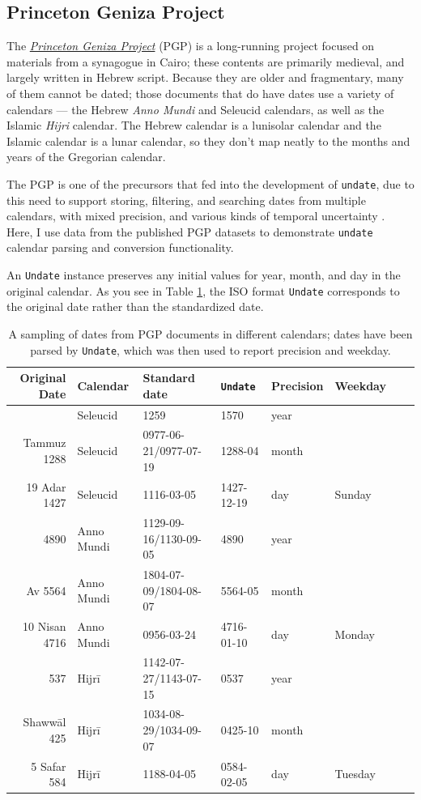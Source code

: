 \documentclass[final]{anthology-ch} %
\begin{document}
\subsection{Princeton Geniza Project}\label{princeton-geniza-project}

The \href{https://geniza.princeton.edu/}{\textit{Princeton Geniza Project}} (PGP) is a long-running project focused on materials from a synagogue in Cairo; these contents are primarily medieval, and largely written in Hebrew script. Because they are older and fragmentary, many of them cannot be dated;  those documents that do have dates use a variety of calendars — the Hebrew \textit{Anno Mundi} and Seleucid calendars, as well as the Islamic \textit{Hijri} calendar. The Hebrew calendar is a lunisolar calendar and the Islamic calendar is a lunar calendar, so they don't map neatly to the months and years of the Gregorian calendar.

The PGP is one of the precursors that fed into the development of \texttt{undate}, due to this need to support storing, filtering, and searching dates from multiple calendars, with mixed precision, and various kinds of temporal uncertainty \cite{rustow_dating_2020}. Here, I use data from the published PGP datasets \cite{rustow_princeton_2025} to demonstrate \texttt{undate} calendar parsing and conversion functionality. 

An \texttt{Undate} instance preserves any initial values for year, month, and day in the original calendar. As you see in Table \ref{tab:pgp-parsed-dates}, the ISO format \texttt{Undate} corresponds to the original date rather than the standardized date.

\begin{table}[h]
  \centering 
  \begin{tabular}{rlllllll}
    \toprule
Original Date & Calendar & Standard date & \texttt{Undate} & Precision & Weekday \\ 
\midrule\addlinespace[2.5pt]
1570 & Seleucid & 1259 & 1570 & year &  \\
Tammuz 1288 & Seleucid & 0977-06-21/0977-07-19 & 1288-04 & month &  \\
19 Adar 1427 & Seleucid & 1116-03-05 & 1427-12-19 & day & Sunday \\
\midrule
4890 & Anno Mundi & 1129-09-16/1130-09-05 & 4890 & year &  \\
Av 5564 & Anno Mundi & 1804-07-09/1804-08-07 & 5564-05 & month &  \\
10 Nisan 4716 & Anno Mundi & 0956-03-24 & 4716-01-10 & day & Monday \\
\midrule
537 & Hijrī & 1142-07-27/1143-07-15 & 0537 & year &  \\
Shawwāl 425 & Hijrī & 1034-08-29/1034-09-07 & 0425-10 & month &  \\
5 Safar 584 & Hijrī & 1188-04-05 & 0584-02-05 & day & Tuesday \\
\bottomrule
    \bottomrule
  \end{tabular}
  \caption{A sampling of dates from PGP documents in different calendars; dates have been parsed by \texttt{Undate}, which was then used to report precision and weekday.}
  \label{tab:pgp-parsed-dates}
\end{table}
\end{document}
